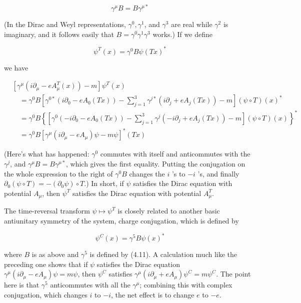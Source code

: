 \documentclass[10pt, letterpaper]{article}
\begin{document}
$$
\gamma^{\mu} B=B \gamma^{\mu *}
$$

(In the Dirac and Weyl representations, $\gamma^{0}, \gamma^{1}$, and $\gamma^{3}$ are real while $\gamma^{2}$ is imaginary, and it follows easily that $B=\gamma^{0} \gamma^{1} \gamma^{3}$ works.) If we define

$$
\psi^{T}(x)=\gamma^{0} B \psi(T x)^{*}
$$

we have

$$
\begin{aligned}
& {\left[\gamma^{\mu}\left(i \partial_{\mu}-e A_{\mu}^{T}(x)\right)-m\right] \psi^{T}(x)} \\
& \quad=\gamma^{0} B\left[\gamma^{0 *}\left(i \partial_{0}-e A_{0}(T x)\right)-\sum_{j=1}^{3} \gamma^{j *}\left(i \partial_{j}+e A_{j}(T x)\right)-m\right](\psi \circ T)(x)^{*} \\
& \quad=\gamma^{0} B\left\{\left[\gamma^{0}\left(-i \partial_{0}-e A_{0}(T x)\right)-\sum_{j=1}^{3} \gamma^{j}\left(-i \partial_{j}+e A_{j}(T x)\right)-m\right](\psi \circ T)(x)\right\}^{*} \\
& \quad=\gamma^{0} B\left[\gamma^{\mu}\left(i \partial_{\mu}-e A_{\mu}\right) \psi-m \psi\right]^{*}(T x)
\end{aligned}
$$

(Here's what has happened: $\gamma^{0}$ commutes with itself and anticommutes with the $\gamma^{j}$, and $\gamma^{\mu} B=B \gamma^{\mu *}$, which gives the first equality. Putting the conjugation on the whole expression to the right of $\gamma^{0} B$ changes the $i$ 's to $-i$ 's, and finally $\partial_{0}(\psi \circ T)=-\left(\partial_{0} \psi\right) \circ T$.) In short, if $\psi$ satisfies the Dirac equation with potential $A_{\mu}$, then $\psi^{T}$ satisfies the Dirac equation with potential $A_{\mu}^{T}$.

The time-reversal transform $\psi \mapsto \psi^{T}$ is closely related to another basic antiunitary symmetry of the system, charge conjugation, which is defined by

$$
\psi^{C}(x)=\gamma^{5} B \psi(x)^{*}
$$

where $B$ is as above and $\gamma^{5}$ is defined by (4.11). A calculation much like the preceding one shows that if $\psi$ satisfies the Dirac equation $\gamma^{\mu}\left(i \partial_{\mu}-e A_{\mu}\right) \psi=m \psi$, then $\psi^{C}$ satisfies $\gamma^{\mu}\left(i \partial_{\mu}+e A_{\mu}\right) \psi^{C}=m \psi^{C}$. The point here is that $\gamma^{5}$ anticommutes with all the $\gamma^{\mu}$; combining this with complex conjugation, which changes $i$ to $-i$, the net effect is to change $e$ to $-e$.
\end{document}
